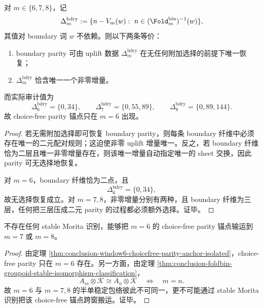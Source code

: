 \begin{theorem}[dyadic boundary uplift 的 choice-free parity 锚点仅在 \texorpdfstring{$m=6$}{m=6} 出现]\label{thm:conclusion-window6-choicefree-parity-anchor-isolated}
对 \(m\in\{6,7,8\}\)，记
\[
\Delta_m^{\mathrm{bdry}}
:=
\{n-V_m(w):\ n\in (\Fold_m^{\mathrm{bin}})^{-1}(w)\},
\]
其值对 boundary 词 \(w\) 不依赖。则以下两条等价：
\begin{enumerate}
  \item boundary parity 可由 uplift 数据 \(\Delta_m^{\mathrm{bdry}}\) 在无任何附加选择的前提下唯一恢复；
  \item \(\Delta_m^{\mathrm{bdry}}\) 恰含唯一一个非零增量。
\end{enumerate}
而实际审计值为
\[
\Delta_6^{\mathrm{bdry}}=\{0,34\},
\qquad
\Delta_7^{\mathrm{bdry}}=\{0,55,89\},
\qquad
\Delta_8^{\mathrm{bdry}}=\{0,89,144\}.
\]
故 choice-free parity 锚点只在 \(m=6\) 出现。
\end{theorem}
\begin{proof}
若无需附加选择即可恢复 boundary parity，则每条 boundary 纤维中必须存在唯一的二元配对规则；这迫使非零 uplift 增量唯一。反之，若 boundary 纤维恰为二层且唯一非零增量存在，则该唯一增量自动指定唯一的 sheet 交换，因此 parity 可无选择地恢复。

对 \(m=6\)，boundary 纤维恰为二点，且
\[
\Delta_6^{\mathrm{bdry}}=\{0,34\},
\]
故无选择恢复成立。对 \(m=7,8\)，非零增量分别有两种，且 boundary 纤维为三层，任何把三层压成二元 parity 的过程都必须额外选择。证毕。
\end{proof}

\begin{corollary}\label{cor:conclusion-window6-choicefree-parity-not-stably-morita-transportable}
不存在任何 stable Morita 识别，能够把 \(m=6\) 的 choice-free parity 锚点输运到 \(m=7\) 或 \(m=8\)。
\end{corollary}
\begin{proof}
由定理 \ref{thm:conclusion-window6-choicefree-parity-anchor-isolated}，choice-free parity 只在 \(m=6\) 存在。另一方面，由定理 \ref{thm:conclusion-foldbin-groupoid-stable-isomorphism-classification}，
\[
A_m\otimes\mathcal K\cong A_n\otimes\mathcal K
\quad\Longleftrightarrow\quad
m=n.
\]
故 \(m=6\) 与 \(m=7,8\) 的半单稳定包络彼此不可同一，更不可能通过 stable Morita 识别把该 choice-free 锚点跨窗搬运。证毕。
\end{proof}

